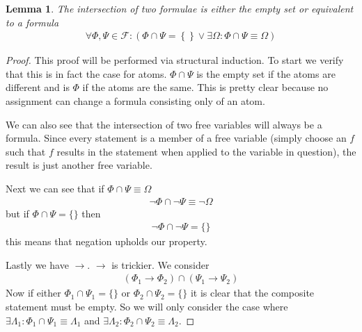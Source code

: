 \documentclass{article}
\newtheorem{lem}{Lemma}
\begin{document}
\begin{lem}
The intersection of two formulae is either the empty set or equivalent to a formula
\begin{align*}
\forall \Phi,\Psi \in \mathcal{F} : \left(\Phi \cap \Psi = \left\{\right\} \lor \exists \Omega : \Phi \cap \Psi \equiv \Omega \right)
\end{align*}
\end{lem}
\begin{proof}
This proof will be performed via structural induction.
To start we verify that this is in fact the case for atoms.
$\Phi \cap \Psi$ is the empty set if the atoms are different and is $\Phi$ if the atoms are the same.
This is pretty clear because no assignment can change a formula consisting only of an atom.

We can also see that the intersection of two free variables will always be a formula.
Since every statement is a member of a free variable (simply choose an $f$ such that $f$ results in the statement when applied to the variable in question),
the result is just another free variable.

Next we can see that if $\Phi \cap \Psi \equiv \Omega$
\begin{align*}
\neg \Phi \cap \neg \Psi \equiv \neg \Omega
\end{align*}
but if $\Phi \cap \Psi = \{\}$ then
\begin{align*}
\neg \Phi \cap \neg \Psi = \{\}
\end{align*}
this means that negation upholds our property.

Lastly we have $\rightarrow$.
$\rightarrow$ is trickier.
We consider
\begin{align*}
(\Phi_1 \rightarrow \Phi_2) \cap (\Psi_1 \rightarrow \Psi_2)
\end{align*}
Now if either $\Phi_1 \cap \Psi_1 = \{\}$ or $\Phi_2 \cap \Psi_2 = \{\}$ it is clear that the composite statement must be empty.
So we will only consider the case where $\exists \Lambda_1 : \Phi_1 \cap \Psi_1 \equiv \Lambda_1$ and $\exists \Lambda_2 : \Phi_2 \cap \Psi_2 \equiv \Lambda_2$.


\end{proof}
\end{document}
